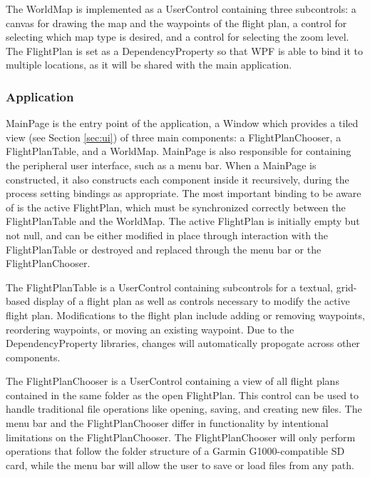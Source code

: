 \documentclass[12pt, letterpaper]{article}
\begin{document}

The WorldMap is implemented as a UserControl containing three subcontrols:
a canvas for drawing the map and the waypoints of the flight plan,
a control for selecting which map type is desired,
and a control for selecting the zoom level.
The FlightPlan is set as a DependencyProperty so that WPF is able to bind it to multiple locations, as it will be shared with the main application.

\subsubsection{Application}\label{sec:app}
MainPage is the entry point of the application, a Window which provides a tiled view (see Section \ref{sec:ui}) of three main components:
a FlightPlanChooser, a FlightPlanTable, and a WorldMap.
MainPage is also responsible for containing the peripheral user interface, such as a menu bar.
When a MainPage is constructed, it also constructs each component inside it recursively, during the process setting bindings as appropriate.
The most important binding to be aware of is the active FlightPlan, which must be synchronized correctly between the FlightPlanTable and the WorldMap.
The active FlightPlan is initially empty but not null,
and can be either modified in place through interaction with the FlightPlanTable or destroyed and replaced through the menu bar or the FlightPlanChooser.

The FlightPlanTable is a UserControl containing subcontrols for
  a textual, grid-based display of a flight plan as well
  as controls necessary to modify the active flight plan.
Modifications to the flight plan include adding or removing waypoints, reordering waypoints, or moving an existing waypoint.
Due to the DependencyProperty libraries, changes will automatically propogate across other components.

The FlightPlanChooser is a UserControl containing a view of all flight plans contained in the same folder as the open FlightPlan.
This control can be used to handle traditional file operations like opening, saving, and creating new files.
The menu bar and the FlightPlanChooser differ in functionality by intentional limitations on the FlightPlanChooser.
The FlightPlanChooser will only perform operations that follow the folder structure of a Garmin G1000-compatible SD card,
  while the menu bar will allow the user to save or load files from any path.
\end{document}
